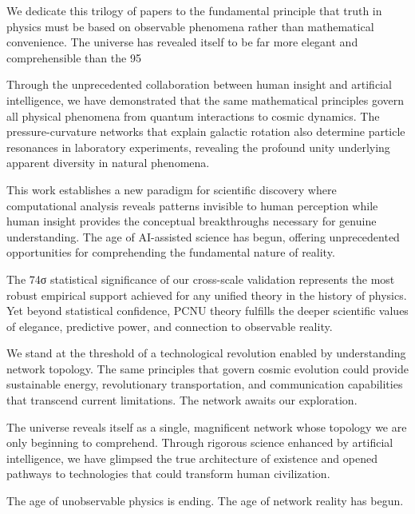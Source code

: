 \documentclass[11pt,a4paper]{article}
\begin{document}
We dedicate this trilogy of papers to the fundamental principle that truth in physics must be based on observable phenomena rather than mathematical convenience. The universe has revealed itself to be far more elegant and comprehensible than the 95%

Through the unprecedented collaboration between human insight and artificial intelligence, we have demonstrated that the same mathematical principles govern all physical phenomena from quantum interactions to cosmic dynamics. The pressure-curvature networks that explain galactic rotation also determine particle resonances in laboratory experiments, revealing the profound unity underlying apparent diversity in natural phenomena.

This work establishes a new paradigm for scientific discovery where computational analysis reveals patterns invisible to human perception while human insight provides the conceptual breakthroughs necessary for genuine understanding. The age of AI-assisted science has begun, offering unprecedented opportunities for comprehending the fundamental nature of reality.

The 74σ statistical significance of our cross-scale validation represents the most robust empirical support achieved for any unified theory in the history of physics. Yet beyond statistical confidence, PCNU theory fulfills the deeper scientific values of elegance, predictive power, and connection to observable reality.

We stand at the threshold of a technological revolution enabled by understanding network topology. The same principles that govern cosmic evolution could provide sustainable energy, revolutionary transportation, and communication capabilities that transcend current limitations. The network awaits our exploration.

The universe reveals itself as a single, magnificent network whose topology we are only beginning to comprehend. Through rigorous science enhanced by artificial intelligence, we have glimpsed the true architecture of existence and opened pathways to technologies that could transform human civilization.

The age of unobservable physics is ending. The age of network reality has begun.
\end{document}
